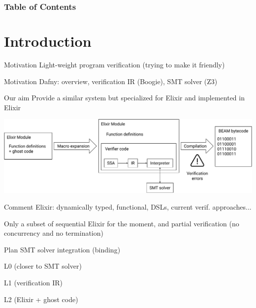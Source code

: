 \documentclass{beamer}
\title{\titulo}
\subtitle{Master's Degree in Formal Methods and Computer Engineering}
\date{\today}
\author{\autor \\ Supervisor: Manuel Montenegro Montes}
\institute{Complutense University of Madrid}
\begin{document}
  \maketitle
  \begin{frame}
    \frametitle{Table of Contents}
    \tableofcontents
  \end{frame}
  \section{Introduction}
  \begin{frame}{Motivation}
    Light-weight program verification (trying to make it friendly)
  \end{frame}
  \begin{frame}{Motivation}
    Dafny: overview, verification IR (Boogie), SMT solver (Z3)
  \end{frame}
  \begin{frame}{Our aim}
    Provide a similar system but specialized for Elixir
    and implemented in Elixir

    \includegraphics[width=\textwidth]{Images/Vectorial/Diagram.pdf}

    Comment Elixir: dynamically typed, functional, DSLs, current verif. 
    approaches...

    Only a subset of sequential Elixir for the moment, and partial verification
    (no concurrency and no termination)
  \end{frame}
  \begin{frame}{Plan}
    SMT solver integration (binding)

    L0 (closer to SMT solver)

    L1 (verification IR)

    L2 (Elixir + ghost code)
  \end{frame}
\end{document}
